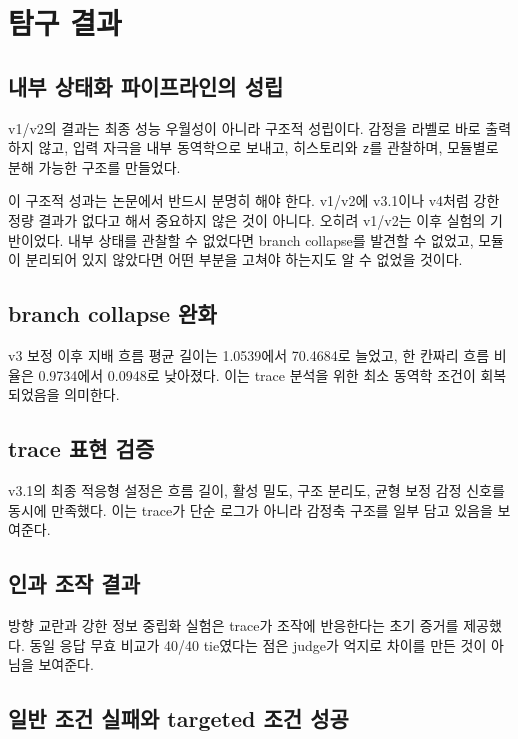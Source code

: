 \documentclass[11pt,a4paper]{article}
\newcommand{\eng}[1]{\texttt{#1}}
\begin{document}
\section{탐구 결과}

\subsection{내부 상태화 파이프라인의 성립}

v1/v2의 결과는 최종 성능 우월성이 아니라 구조적 성립이다. 감정을 라벨로 바로 출력하지 않고, 입력 자극을 내부 동역학으로 보내고, 히스토리와 \eng{z}를 관찰하며, 모듈별로 분해 가능한 구조를 만들었다.

이 구조적 성과는 논문에서 반드시 분명히 해야 한다. v1/v2에 v3.1이나 v4처럼 강한 정량 결과가 없다고 해서 중요하지 않은 것이 아니다. 오히려 v1/v2는 이후 실험의 기반이었다. 내부 상태를 관찰할 수 없었다면 branch collapse를 발견할 수 없었고, 모듈이 분리되어 있지 않았다면 어떤 부분을 고쳐야 하는지도 알 수 없었을 것이다.

\subsection{branch collapse 완화}

v3 보정 이후 지배 흐름 평균 길이는 1.0539에서 70.4684로 늘었고, 한 칸짜리 흐름 비율은 0.9734에서 0.0948로 낮아졌다. 이는 trace 분석을 위한 최소 동역학 조건이 회복되었음을 의미한다.

\subsection{trace 표현 검증}

v3.1의 최종 적응형 설정은 흐름 길이, 활성 밀도, 구조 분리도, 균형 보정 감정 신호를 동시에 만족했다. 이는 trace가 단순 로그가 아니라 감정축 구조를 일부 담고 있음을 보여준다.

\subsection{인과 조작 결과}

방향 교란과 강한 정보 중립화 실험은 trace가 조작에 반응한다는 초기 증거를 제공했다. 동일 응답 무효 비교가 40/40 tie였다는 점은 judge가 억지로 차이를 만든 것이 아님을 보여준다.

\subsection{일반 조건 실패와 targeted 조건 성공}
\end{document}
